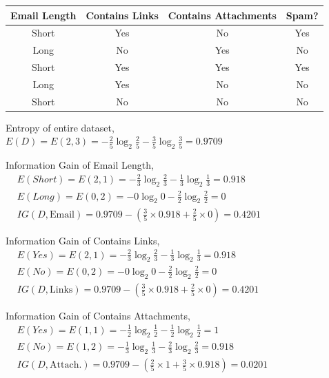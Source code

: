\begin{multicols}{2}
\begin{tabularx}{0.47\textwidth}{|c|C|C|c|}
   \hline
   \textbf{Email Length} & \textbf{Contains Links} & \textbf{Contains Attachments} & \textbf{Spam?} \\\hline
   Short & Yes & No & Yes \\
   Long & No & Yes & No \\
   Short & Yes & Yes & Yes \\
   Long & Yes & No & No \\
   Short & No & No & No \\\hline
\end{tabularx}

Entropy of entire dataset,\\[0.5em]
$E(D) = E(2,3) = -\frac{2}{5}\log_2{\frac{2}{5}}-\frac{3}{5}\log_2{\frac{3}{5}} = 0.9709$

\pagebreak
Information Gain of Email Length,\\[0.5em]
$\begin{aligned}
&E(Short) = E(2,1) = -\frac{2}{3}\log_2{\frac{2}{3}}-\frac{1}{3}\log_2{\frac{1}{3}}  = 0.918\\
&E(Long) = E(0,2) = -0\log_2{0}-\frac{2}{2}\log_2{\frac{2}{2}} = 0\\
&IG(D, \text{Email}) = 0.9709 - \left(\frac{3}{5} \times 0.918 + \frac{2}{5} \times 0\right) = 0.4201
\end{aligned}$


Information Gain of Contains Links,\\[0.5em]
$\begin{aligned}
&E(Yes) = E(2,1) = -\frac{2}{3}\log_2{\frac{2}{3}}-\frac{1}{3}\log_2{\frac{1}{3}}  = 0.918\\
&E(No) = E(0,2) = -0\log_2{0}-\frac{2}{2}\log_2{\frac{2}{2}} = 0\\
&IG(D, \text{Links}) = 0.9709 - \left(\frac{3}{5} \times 0.918 + \frac{2}{5} \times 0\right) = 0.4201
\end{aligned}$


Information Gain of Contains Attachments,\\[0.5em]
$\begin{aligned}
&E(Yes) = E(1,1) = -\frac{1}{2}\log_2{\frac{1}{2}}-\frac{1}{2}\log_2{\frac{1}{2}}  = 1\\
&E(No) = E(1,2) = -\frac{1}{3}\log_2{\frac{1}{3}}-\frac{2}{3}\log_2{\frac{2}{3}} = 0.918\\
&IG(D, \text{Attach.}) = 0.9709 - \left(\frac{2}{5} \times 1 + \frac{3}{5} \times 0.918\right) = 0.0201
\end{aligned}$



\end{multicols}
